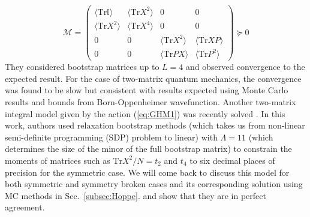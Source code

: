 \documentclass[11pt]{article}
\begin{document}
\begin{equation}
	\mathcal{M} = 
	\begin{pmatrix}
		\langle \mbox{Tr}\mathbb{I} \rangle & \langle \mbox{Tr} X^2 \rangle & 0 & 0 \\
		\langle \mbox{Tr} X^2 \rangle & \langle \mbox{Tr} X^4 \rangle  & 0 & 0 \\ 
		0 & 0 & \langle \mbox{Tr} X^2 \rangle & \langle \mbox{Tr} XP \rangle \\
		0 & 0  & \langle \mbox{Tr} PX \rangle & \langle \mbox{Tr} P^2 \rangle
	\end{pmatrix}  \succeq 0
\end{equation}
They considered bootstrap matrices up to $L=4$ and observed
convergence to the expected result. 
For the case of two-matrix quantum mechanics, the convergence
was found to be slow but consistent with results expected using Monte Carlo results and bounds from Born-Oppenheimer wavefunction. Another two-matrix integral model given by the action (\ref{eq:GHM1}) was recently solved \cite{Kazakov:2021lel}. 
In this work, authors used relaxation bootstrap methods (which takes us 
from non-linear semi-definite programming (SDP) problem to linear) with
$\Lambda=11$ (which determines the size of the minor of the full bootstrap matrix) 
to constrain the moments of matrices such as $\mathrm{Tr}X^2/N = t_{2}$ and $t_{4}$ 
to six decimal places of precision for the symmetric case. We will come back to 
discuss this model for both symmetric and symmetry broken cases 
and its corresponding solution using MC methods in Sec.~\ref{subsec:Hoppe}. 
and show that they are in perfect agreement.  
\end{document}
